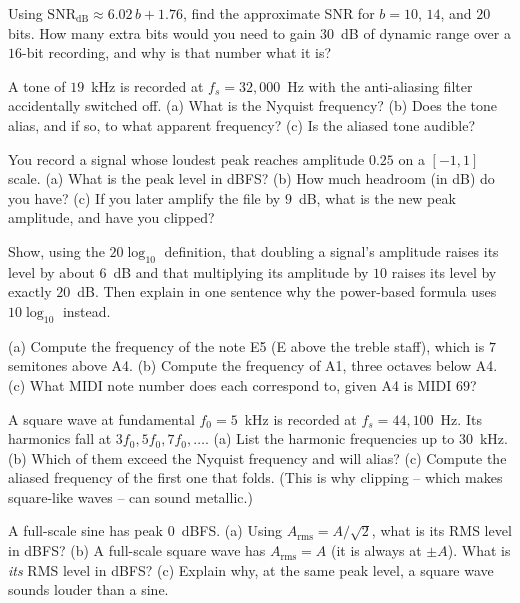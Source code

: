 \begin{exercise}
Using $\mathrm{SNR}_{\text{dB}} \approx 6.02\,b + 1.76$, find the approximate SNR for $b = 10$,
$14$, and $20$ bits. How many extra bits would you need to gain $30$~dB of dynamic range over a
$16$-bit recording, and why is that number what it is?
\end{exercise}

\begin{exercise}
A tone of $19$~kHz is recorded at $f_s = 32{,}000$~Hz with the anti-aliasing filter accidentally
switched off. (a) What is the Nyquist frequency? (b) Does the tone alias, and if so, to what
apparent frequency? (c) Is the aliased tone audible?
\end{exercise}

\begin{exercise}
You record a signal whose loudest peak reaches amplitude $0.25$ on a $[-1,1]$ scale. (a) What is
the peak level in dBFS? (b) How much headroom (in dB) do you have? (c) If you later amplify the
file by $9$~dB, what is the new peak amplitude, and have you clipped?
\end{exercise}

\begin{exercise}
Show, using the $20\log_{10}$ definition, that doubling a signal's amplitude raises its level by
about $6$~dB and that multiplying its amplitude by $10$ raises its level by exactly $20$~dB. Then
explain in one sentence why the power-based formula uses $10\log_{10}$ instead.
\end{exercise}

\begin{exercise}
(a) Compute the frequency of the note E5 (E above the treble staff), which is $7$ semitones above
A4. (b) Compute the frequency of A1, three octaves below A4. (c) What MIDI note number does each
correspond to, given A4 is MIDI $69$?
\end{exercise}

\begin{exercise}
A square wave at fundamental $f_0 = 5$~kHz is recorded at $f_s = 44{,}100$~Hz. Its harmonics fall
at $3f_0, 5f_0, 7f_0, \dots$. (a) List the harmonic frequencies up to $30$~kHz. (b) Which of them
exceed the Nyquist frequency and will alias? (c) Compute the aliased frequency of the first one
that folds. (This is why clipping -- which makes square-like waves -- can sound metallic.)
\end{exercise}

\begin{exercise}
A full-scale sine has peak $0$~dBFS. (a) Using $A_{\text{rms}} = A/\sqrt{2}$, what is its RMS
level in dBFS? (b) A full-scale square wave has $A_{\text{rms}} = A$ (it is always at $\pm A$).
What is \emph{its} RMS level in dBFS? (c) Explain why, at the same peak level, a square wave
sounds louder than a sine.
\end{exercise}


